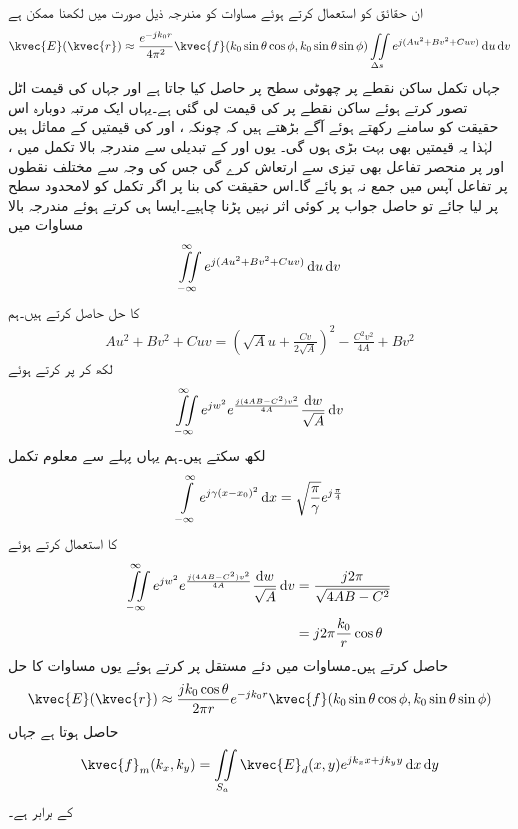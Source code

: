 ان حقائق کو استعمال کرتے ہوئے مساوات  کو مندرجہ ذیل صورت میں لکھنا ممکن ہے
\begin{align}
\kvec{E}(\kvec{r}) \approx \frac{e^{-jk_0 r}}{4\pi^2}\kvec{f}(k_0 \sin \theta \cos \phi,k_0 \sin\theta\sin\phi)\iint \limits_{\Delta s} e^{j (A u^2+ B v^2+C uv)} \dif u \dif v
\end{align}
جہاں تکمل  ساکن نقطے پر چھوٹی سطح  پر حاصل کیا جاتا ہے اور جہاں  کی قیمت اٹل تصور کرتے ہوئے ساکن نقطے پر  کی قیمت لی گئی ہے۔یہاں ایک مرتبہ دوبارہ اس حقیقت کو سامنے رکھتے ہوئے آگے بڑھتے ہیں کہ چونکہ ،  اور  کی قیمتیں  کے مماثل ہیں لہٰذا یہ قیمتیں بھی بہت بڑی ہوں گی۔ یوں  اور  کے تبدیلی سے مندرجہ بالا تکمل میں ،  اور  پر منحصر تفاعل بھی تیزی سے ارتعاش کرے گی جس کی وجہ سے مختلف نقطوں پر تفاعل آپس میں جمع نہ ہو پائے گا۔اس حقیقت کی بنا پر اگر تکمل کو لامحدود سطح پر لیا جائے تو حاصل جواب پر کوئی اثر نہیں پڑنا چاہیے۔ایسا ہی کرتے ہوئے مندرجہ بالا مساوات میں
\begin{align}
\iint \limits_{-\infty}^{\infty} e^{j (A u^2+ B v^2+C uv)} \dif u \dif v
\end{align}
کا حل حاصل کرتے ہیں۔ہم
\begin{align*}
A u^2+Bv^2+Cuv=\left(\sqrt{A} u +\frac{C v}{2\sqrt{A}} \right)^2-\frac{C^2 v^2}{4A}+Bv^2
\end{align*}
لکھ کر  پر کرتے ہوئے
\begin{align}
\iint \limits_{-\infty}^{\infty} e^{j w^2}e^{\frac{j(4AB-C^2)v^2}{4A}} \frac{\dif w}{\sqrt{A}} \dif v
\end{align}
لکھ سکتے ہیں۔ہم یہاں پہلے سے معلوم تکمل
\begin{align}
\int\limits_{-\infty}^{\infty}e^{j \gamma(x-x_0)^2} \dif x=\sqrt{\frac{\pi}{\gamma}} e^{j \frac{\pi}{4}}
\end{align}
کا استعمال کرتے ہوئے
 \begin{align*}
\iint \limits_{-\infty}^{\infty} e^{j w^2}e^{\frac{j(4AB-C^2)v^2}{4A}} \frac{\dif w}{\sqrt{A}} \dif v&=\frac{j 2\pi}{\sqrt{4AB-C^2}}\\
&=j 2\pi \frac{k_0}{r}\cos \theta
\end{align*}
حاصل کرتے ہیں۔مساوات  میں دئے مستقل پر کرتے ہوئے یوں مساوات  کا حل 
\begin{align}\label{مساوات_اینٹینا_فوریئر_بدل}
\kvec{E}(\kvec{r})\approx \frac{j k_0 \cos \theta}{2\pi r} e^{-j k_0 r}\kvec{f}(k_0 \sin \theta \cos \phi,k_0 \sin\theta \sin\phi)
\end{align}
حاصل ہوتا ہے جہاں
\begin{align}
\kvec{f}_m(k_x,k_y)=\iint\limits_{S_a} \kvec{E}_d(x,y) e^{j k_x x +j k_y y} \dif x \dif y
\end{align}
کے برابر ہے۔

